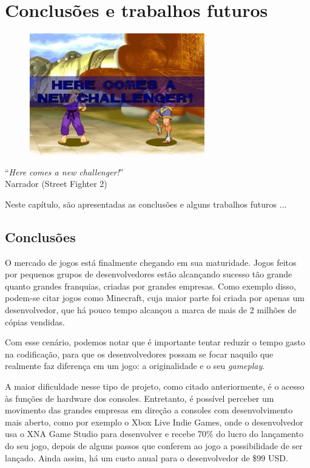 \documentclass[brazil]{abnt}
\begin{document}
\chapter{Conclusões e trabalhos futuros\label{cap:conclusao}}

\vfill{}
\begin{flushright}{}
\begin{figure}[h!]
\hfill\includegraphics{imgs/streetfighter.jpg}
\end{figure}
``\emph{Here comes a new challenger!}''\\
{\small Narrador (Street Fighter 2)}\end{flushright}{\small \par}
\vfill{}

Neste capítulo, são apresentadas as conclusões e alguns trabalhos futuros
...
\newpage


\section{Conclusões}

O mercado de jogos está finalmente chegando em sua maturidade. Jogos feitos por pequenos grupos de desenvolvedores estão alcançando sucesso tão grande quanto grandes franquias, criadas por grandes empresas. Como exemplo disso, podem-se citar jogos como Minecraft, cuja maior parte foi criada por apenas um desenvolvedor, que há pouco tempo alcançou a marca de mais de 2 milhões de cópias vendidas. \cite{MinecraftSales}

Com esse cenário, podemos notar que é importante tentar reduzir o tempo gasto na codificação, para que os desenvolvedores possam se focar naquilo que realmente faz diferença em um jogo: a originalidade e o seu \textit{gameplay}.

A maior dificuldade nesse tipo de projeto, como citado anteriormente, é o acesso às funções de hardware dos consoles. Entretanto, é possível perceber um movimento das grandes empresas em direção a consoles com desenvolvimento mais aberto, como por exemplo o Xbox Live Indie Games, onde o desenvolvedor usa o XNA Game Studio para desenvolver e recebe 70\% do lucro do lançamento do seu jogo, depois de alguns passos que conferem ao jogo a possibilidade de ser lançado. Ainda assim, há um custo anual para o desenvolvedor de \$99 USD. \cite{XNAAppHub}
\end{document}
